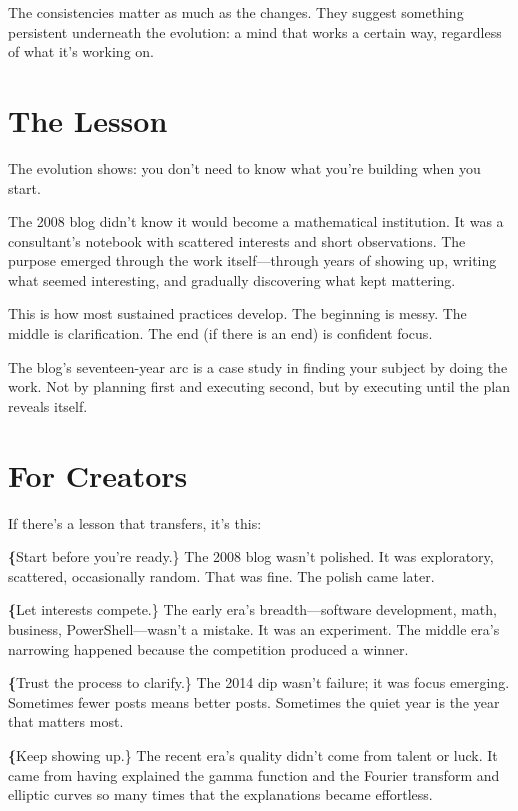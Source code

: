 The consistencies matter as much as the changes. They suggest something persistent underneath the evolution: a mind that works a certain way, regardless of what it's working on.

\bigskip

\section*{The Lesson}

The evolution shows: you don't need to know what you're building when you start.

The 2008 blog didn't know it would become a mathematical institution. It was a consultant's notebook with scattered interests and short observations. The purpose emerged through the work itself—through years of showing up, writing what seemed interesting, and gradually discovering what kept mattering.

This is how most sustained practices develop. The beginning is messy. The middle is clarification. The end (if there is an end) is confident focus.

The blog's seventeen-year arc is a case study in finding your subject by doing the work. Not by planning first and executing second, but by executing until the plan reveals itself.

\bigskip

\section*{For Creators}

If there's a lesson that transfers, it's this:

\textbf\{Start before you're ready.\} The 2008 blog wasn't polished. It was exploratory, scattered, occasionally random. That was fine. The polish came later.

\textbf\{Let interests compete.\} The early era's breadth—software development, math, business, PowerShell—wasn't a mistake. It was an experiment. The middle era's narrowing happened because the competition produced a winner.

\textbf\{Trust the process to clarify.\} The 2014 dip wasn't failure; it was focus emerging. Sometimes fewer posts means better posts. Sometimes the quiet year is the year that matters most.

\textbf\{Keep showing up.\} The recent era's quality didn't come from talent or luck. It came from having explained the gamma function and the Fourier transform and elliptic curves so many times that the explanations became effortless.

